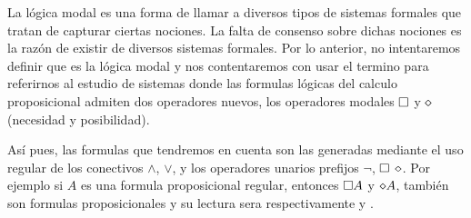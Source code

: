 
La lógica modal es una forma de llamar a diversos tipos de sistemas formales que tratan de capturar ciertas nociones. La falta de consenso sobre dichas nociones es la razón de existir de diversos sistemas formales. Por lo anterior, no intentaremos definir que es la lógica modal y nos contentaremos con usar el termino para referirnos al estudio de sistemas donde las formulas lógicas del calculo proposicional admiten dos operadores nuevos, los operadores modales $\square$ y $\diamond$ (necesidad y posibilidad).

Así pues, las formulas que tendremos en cuenta son las generadas mediante el uso regular de los conectivos $\land$, $\lor$, y los operadores unarios prefijos $\neg$, $\square$ $\diamond$. Por ejemplo si $A$ es una formula proposicional regular, entonces $\square A$ y $\diamond A$, también son formulas proposicionales y su lectura sera respectivamente  y .



